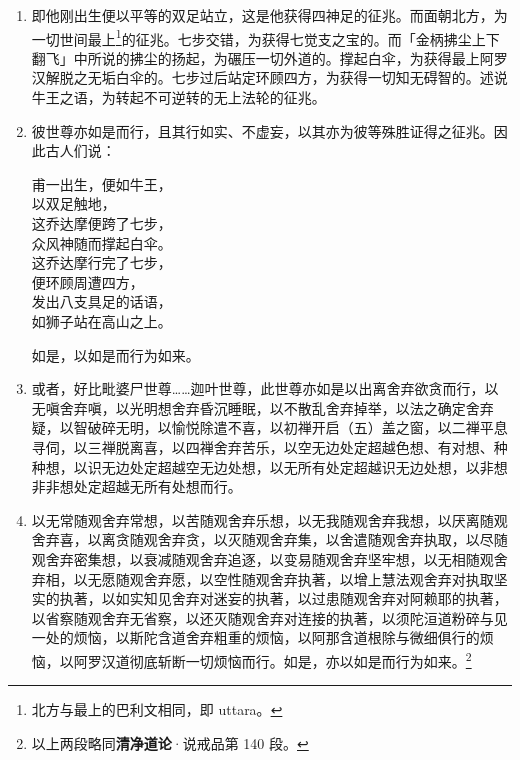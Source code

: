 \begin{enumerate}
\item 即他刚出生便以平等的双足站立，这是他获得四神足的征兆。而面朝北方，为一切世间最上\footnote{北方与最上的巴利文相同，即 uttara。}的征兆。七步交错，为获得七觉支之宝的。而「金柄拂尘上下翻飞」中所说的拂尘的扬起，为碾压一切外道的。撑起白伞，为获得最上阿罗汉解脱之无垢白伞的。七步过后站定环顾四方，为获得一切知无碍智的。述说牛王之语，为转起不可逆转的无上法轮的征兆。
\item 彼世尊亦如是而行，且其行如实、不虚妄，以其亦为彼等殊胜证得之征兆。因此古人们说：\begin{quoting}甫一出生，便如牛王，\\以双足触地，\\这乔达摩便跨了七步，\\众风神随而撑起白伞。\\这乔达摩行完了七步，\\便环顾周遭四方，\\发出八支具足的话语，\\如狮子站在高山之上。\end{quoting}如是，以如是而行为如来。
\item 或者，好比毗婆尸世尊……迦叶世尊，此世尊亦如是以出离舍弃欲贪而行，以无嗔舍弃嗔，以光明想舍弃昏沉睡眠，以不散乱舍弃掉举，以法之确定舍弃疑，以智破碎无明，以愉悦除遣不喜，以初禅开启（五）盖之窗，以二禅平息寻伺，以三禅脱离喜，以四禅舍弃苦乐，以空无边处定超越色想、有对想、种种想，以识无边处定超越空无边处想，以无所有处定超越识无边处想，以非想非非想处定超越无所有处想而行。
\item 以无常随观舍弃常想，以苦随观舍弃乐想，以无我随观舍弃我想，以厌离随观舍弃喜，以离贪随观舍弃贪，以灭随观舍弃集，以舍遣随观舍弃执取，以尽随观舍弃密集想，以衰减随观舍弃追逐，以变易随观舍弃坚牢想，以无相随观舍弃相，以无愿随观舍弃愿，以空性随观舍弃执著，以增上慧法观舍弃对执取坚实的执著，以如实知见舍弃对迷妄的执著，以过患随观舍弃对阿赖耶的执著，以省察随观舍弃无省察，以还灭随观舍弃对连接的执著，以须陀洹道粉碎与见一处的烦恼，以斯陀含道舍弃粗重的烦恼，以阿那含道根除与微细俱行的烦恼，以阿罗汉道彻底斩断一切烦恼而行。如是，亦以如是而行为如来。\footnote{以上两段略同\textbf{清净道论}·说戒品第 140 段。}

\end{enumerate}
